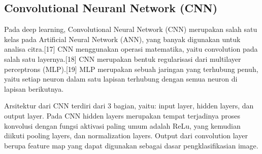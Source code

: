 \subsection{Convolutional Neuranl Network (CNN)}
Pada deep learning, Convolutional Neural Network (CNN) merupakan salah satu kelas pada Artificial Neural Network (ANN), yang banyak digunakan untuk analisa citra.[17] CNN menggunakan operasi matematika, yaitu convolution pada salah satu layernya.[18] CNN merupakan bentuk regularisasi dari multilayer perceptrons (MLP).[19]  MLP merupakan sebuah jaringan yang terhubung penuh, yaitu setiap neuron dalam satu lapisan terhubung dengan semua neuron di lapisan berikutnya.

Arsitektur dari CNN terdiri dari 3 bagian, yaitu: input layer, hidden layers, dan output layer. Pada CNN hidden layers merupakan tempat terjadinya proses konvolusi dengan fungsi aktivasi paling umum adalah ReLu, yang kemudian diikuti pooling layers, dan normalization layers. Output dari convolution layer berupa feature map yang dapat digunakan sebagai dasar pengklasifikasian image.
